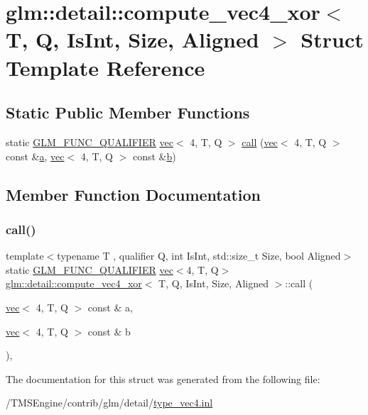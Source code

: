 \hypertarget{structglm_1_1detail_1_1compute__vec4__xor}{}\section{glm\+:\+:detail\+:\+:compute\+\_\+vec4\+\_\+xor$<$ T, Q, Is\+Int, Size, Aligned $>$ Struct Template Reference}
\label{structglm_1_1detail_1_1compute__vec4__xor}
\subsection*{Static Public Member Functions}
\begin{DoxyCompactItemize}
\item 
static \hyperlink{setup_8hpp_a33fdea6f91c5f834105f7415e2a64407}{G\+L\+M\+\_\+\+F\+U\+N\+C\+\_\+\+Q\+U\+A\+L\+I\+F\+I\+ER} \hyperlink{structglm_1_1vec}{vec}$<$ 4, T, Q $>$ \hyperlink{structglm_1_1detail_1_1compute__vec4__xor_ad31aa7edcbc6cadcb41b9f9aac4c7c50}{call} (\hyperlink{structglm_1_1vec}{vec}$<$ 4, T, Q $>$ const \&\hyperlink{_s_d_l__opengl__glext_8h_a3309789fc188587d666cda5ece79cf82}{a}, \hyperlink{structglm_1_1vec}{vec}$<$ 4, T, Q $>$ const \&\hyperlink{_s_d_l__opengl__glext_8h_a0f71581a41fd2264c8944126dabbd010}{b})
\end{DoxyCompactItemize}


\subsection{Member Function Documentation}
\mbox{\label{structglm_1_1detail_1_1compute__vec4__xor_ad31aa7edcbc6cadcb41b9f9aac4c7c50}} 
\subsubsection{\texorpdfstring{call()}{call()}}
{\footnotesize\ttfamily template$<$typename T , qualifier Q, int Is\+Int, std\+::size\+\_\+t Size, bool Aligned$>$ \\
static \hyperlink{setup_8hpp_a33fdea6f91c5f834105f7415e2a64407}{G\+L\+M\+\_\+\+F\+U\+N\+C\+\_\+\+Q\+U\+A\+L\+I\+F\+I\+ER} \hyperlink{structglm_1_1vec}{vec}$<$4, T, Q$>$ \hyperlink{structglm_1_1detail_1_1compute__vec4__xor}{glm\+::detail\+::compute\+\_\+vec4\+\_\+xor}$<$ T, Q, Is\+Int, Size, Aligned $>$\+::call (\begin{DoxyParamCaption}\item[{\hyperlink{structglm_1_1vec}{vec}$<$ 4, T, Q $>$ const \&}]{a,  }\item[{\hyperlink{structglm_1_1vec}{vec}$<$ 4, T, Q $>$ const \&}]{b }\end{DoxyParamCaption})\hspace{0.3cm}{\ttfamily [inline]}, {\ttfamily [static]}}



The documentation for this struct was generated from the following file\+:\begin{DoxyCompactItemize}
\item 
/\+T\+M\+S\+Engine/contrib/glm/detail/\hyperlink{type__vec4_8inl}{type\+\_\+vec4.\+inl}\end{DoxyCompactItemize}

